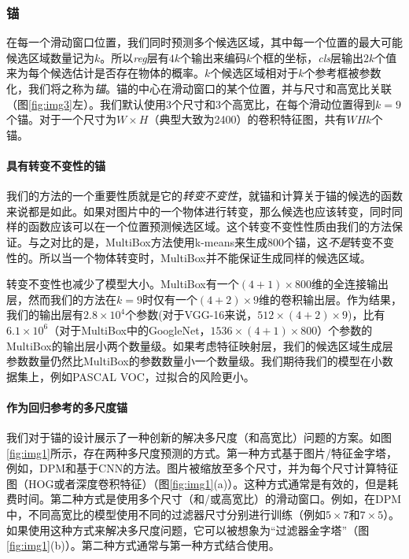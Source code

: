 \documentclass[../main.tex]{subfile}
\begin{document}
\subsubsection{锚}

在每一个滑动窗口位置，我们同时预测多个候选区域，其中每一个位置的最大可能候选区域数量记为$k$。所以\textit{reg}层有$4k$个输出来编码$k$个框的坐标，\textit{cls}层输出$2k$个值来为每个候选估计是否存在物体的概率。$k$个候选区域相对于$k$个参考框被参数化，我们将之称为\textit{锚}。锚的中心在滑动窗口的某个位置，并与尺寸和高宽比关联（图\ref{fig:img3}左）。我们默认使用3个尺寸和3个高宽比，在每个滑动位置得到$k=9$个锚。对于一个尺寸为$W\times H$（典型大致为2400）的卷积特征图，共有$WHk$个锚。

\paragraph*{具有转变不变性的锚}

我们的方法的一个重要性质就是它的\textit{转变不变性}，就锚和计算关于锚的候选的函数来说都是如此。如果对图片中的一个物体进行转变，那么候选也应该转变，同时同样的函数应该可以在一个位置预测候选区域。这个转变不变性性质由我们的方法保证。与之对比的是，MultiBox方法\cite{multiBox1, multiBox2}使用k-means来生成800个锚，这\textit{不是}转变不变性的。所以当一个物体转变时，MultiBox并不能保证生成同样的候选区域。

转变不变性也减少了模型大小。MultiBox有一个$(4 + 1) \times 800$维的全连接输出层，然而我们的方法在$k=9$时仅有一个$(4 + 2) \times 9$维的卷积输出层。作为结果，我们的输出层有$2.8 \times 10^4$个参数(对于VGG-16来说，$512 \times (4 + 2) \times 9$)，比有$6.1 \times 10^6$（对于MultiBox中的GoogleNet，$1536\times (4+1)\times 800$）个参数的MultiBox的输出层小两个数量级。如果考虑特征映射层，我们的候选区域生成层参数数量仍然比MultiBox的参数数量小一个数量级。我们期待我们的模型在小数据集上，例如PASCAL VOC，过拟合的风险更小。

\paragraph*{作为回归参考的多尺度锚}

我们对于锚的设计展示了一种创新的解决多尺度（和高宽比）问题的方案。如图\ref{fig:img1}所示，存在两种多尺度预测的方式。第一种方式基于图片/特征金字塔，例如，DPM\cite{dpm}和基于CNN的方法\cite{overfeat, rcnn, fastrcnn}。图片被缩放至多个尺寸，并为每个尺寸计算特征图（HOG\cite{dpm}或者深度卷积特征\cite{overfeat, rcnn, fastrcnn}）（图\ref{fig:img1}(a)）。这种方式通常是有效的，但是耗费时间。第二种方式是使用多个尺寸（和/或高宽比）的滑动窗口。例如，在DPM\cite{dpm}中，不同高宽比的模型使用不同的过滤器尺寸分别进行训练（例如$5\times 7$和$7\times 5$）。如果使用这种方式来解决多尺度问题，它可以被想象为“过滤器金字塔”（图\ref{fig:img1}(b)）。第二种方式通常与第一种方式结合使用。
\end{document}
